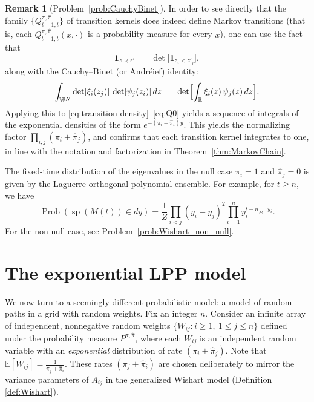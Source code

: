 \documentclass[letterpaper,11pt,oneside,reqno]{article}
\numberwithin{equation}{section}
\theoremstyle{definition}
\newtheorem{remark}[proposition]{Remark}
\begin{document}
\begin{remark}[Problem~\ref{prob:CauchyBinet}]
\label{rem:CauchyBinet}
In order to see directly that the family $\bigl\{Q^{\pi,\hat{\pi}}_{t-1,t}\bigr\}$ of transition kernels does indeed define Markov transitions (that is, each $Q^{\pi,\hat{\pi}}_{t-1,t}(x,\cdot)$ is a probability measure for every $x$), one can use the fact that
\[
	\mathbf{1}_{z \prec z'}
\;=\;
\det\bigl[\mathbf{1}_{z_i < z'_j}\bigr],
\]
along with the Cauchy--Binet (or Andr\'eief) identity:
\[
\int_{\mathbb{W}^N}
\det[\xi_i(z_j)]\,
\det[\psi_j(z_i)]
\,dz
\;=\;
\det\Bigl[
\int_{\mathbb{R}}
\xi_i(z)\,\psi_j(z)\,dz
\Bigr].
\]
Applying this to
\eqref{eq:transition-density}--\eqref{eq:Q0}
yields a sequence of integrals
of the exponential densities
of the form $e^{-(\pi_i+\hat \pi_t)y}$.
This yields the normalizing factor
$\prod_{i,j}(\pi_i+\hat \pi_j)$,
and confirms
that each transition kernel
integrates to one, in line with the notation and
factorization in Theorem~\ref{thm:MarkovChain}.
\end{remark}

The fixed-time distribution of the eigenvalues
in the null case $\pi_i=1$ and $\hat\pi_j=0$ is
given by the Laguerre orthogonal polynomial ensemble. For example, for $t\ge n$, we have
\begin{equation}
	\label{eq:Laguerre}
	\operatorname{Prob}(\operatorname{sp}(M(t))\in dy)
	=
	\frac{1}{Z}\prod_{i<j}(y_i-y_j)^2
	\prod_{i=1}^n y_i^{t-n} e^{-y_i}.
\end{equation}
For the non-null case, see Problem~\ref{prob:Wishart_non_null}.

\section{The exponential LPP model}

We now turn to a seemingly different probabilistic model: a
model of random paths in a grid with random weights. Fix an
integer $n$. Consider an infinite array of independent,
nonnegative random weights $\{W_{ij}: i\ge 1,\ 1\le j\le n\}$ defined under the probability measure $P^{\pi,\hat\pi}$,
where each $W_{ij}$ is an independent random variable with
an \emph{exponential} distribution of rate $(\pi_i +
\hat\pi_j)$.
Note that $\mathbb{E}[W_{ij}] = \frac{1}{\pi_j+\hat\pi_i}$.
These rates $(\pi_j+\hat\pi_i)$ are chosen deliberately to
mirror the variance parameters of $A_{ij}$ in the
generalized Wishart model (Definition \ref{def:Wishart}).
\end{document}
